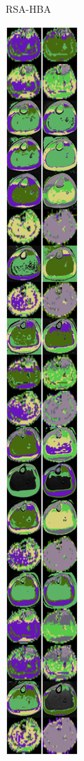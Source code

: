 \documentclass[conference]{IEEEtran}
\begin{document}
\begin{figure}[!htb]
\begin{subfigure}[b]{0.13\textwidth}
		\caption{RSA-HBA}
		\label{fig:imagen1}
	\end{subfigure}
	\begin{subfigure}[b]{0.13\textwidth}
		\includegraphics[width=\textwidth]{Umbrales/kapur/Dim7/OPA_BES_Dim7_Kapur.png}

\end{subfigure}
\end{figure}
\end{document}
